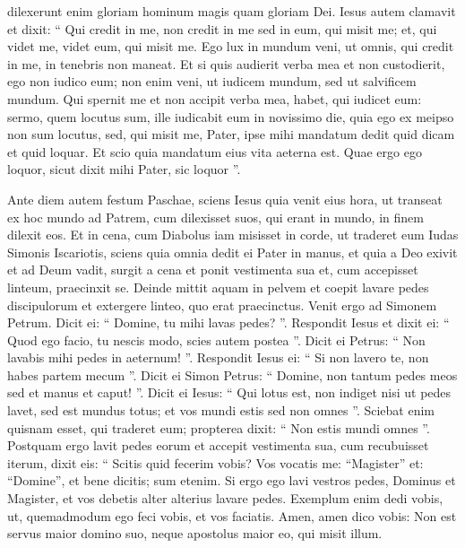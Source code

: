\begin{biblechapter}
\begin{biblechapter}
\begin{biblechapter}
\begin{biblechapter}
\begin{biblechapter}
\begin{biblechapter}
\begin{biblechapter}
\begin{biblechapter}
\begin{biblechapter}
\begin{biblechapter}
\begin{biblechapter}
\begin{biblechapter}
\verse dilexerunt enim gloriam hominum magis quam gloriam Dei.
 \verse Iesus autem clamavit et dixit: “ Qui credit in me, non credit in me sed in eum, qui misit me; 
\verse et, qui videt me, videt eum, qui misit me. 
\verse Ego lux in mundum veni, ut omnis, qui credit in me, in tenebris non maneat. 
\verse Et si quis audierit verba mea et non custodierit, ego non iudico eum; non enim veni, ut iudicem mundum, sed ut salvificem mundum. 
\verse Qui spernit me et non accipit verba mea, habet, qui iudicet eum: sermo, quem locutus sum, ille iudicabit eum in novissimo die, 
\verse quia ego ex meipso non sum locutus, sed, qui misit me, Pater, ipse mihi mandatum dedit quid dicam et quid loquar. 
\verse Et scio quia mandatum eius vita aeterna est. Quae ergo ego loquor, sicut dixit mihi Pater, sic loquor ”.
 
\begin{biblechapter}
\verse Ante diem autem festum Paschae, sciens Iesus quia venit eius hora, ut transeat ex hoc mundo ad Patrem, cum dilexisset suos, qui erant in mundo, in finem dilexit eos. 
\verse Et in cena, cum Diabolus iam misisset in corde, ut traderet eum Iudas Simonis Iscariotis, 
\verse sciens quia omnia dedit ei Pater in manus, et quia a Deo exivit et ad Deum vadit, 
\verse surgit a cena et ponit vestimenta sua et, cum accepisset linteum, praecinxit se. 
\verse Deinde mittit aquam in pelvem et coepit lavare pedes discipulorum et extergere linteo, quo erat praecinctus. 
\verse Venit ergo ad Simonem Petrum. Dicit ei: “ Domine, tu mihi lavas pedes? ”. 
\verse Respondit Iesus et dixit ei: “ Quod ego facio, tu nescis modo, scies autem postea ”. 
\verse Dicit ei Petrus: “ Non lavabis mihi pedes in aeternum! ”. Respondit Iesus ei: “ Si non lavero te, non habes partem mecum ”. 
\verse Dicit ei Simon Petrus: “ Domine, non tantum pedes meos sed et manus et caput! ”. 
\verse Dicit ei Iesus: “ Qui lotus est, non indiget nisi ut pedes lavet, sed est mundus totus; et vos mundi estis sed non omnes ”. 
\verse Sciebat enim quisnam esset, qui traderet eum; propterea dixit: “ Non estis mundi omnes ”.
 \verse Postquam ergo lavit pedes eorum et accepit vestimenta sua, cum recubuisset iterum, dixit eis: “ Scitis quid fecerim vobis? 
\verse Vos vocatis me: “Magister” et: “Domine”, et bene dicitis; sum etenim. 
\verse Si ergo ego lavi vestros pedes, Dominus et Magister, et vos debetis alter alterius lavare pedes. 
 \verse Exemplum enim dedi vobis, ut, quemadmodum ego feci vobis, et vos faciatis. 
 \verse Amen, amen dico vobis: Non est servus maior domino suo, neque apostolus maior eo, qui misit illum. 

\end{biblechapter}
\end{biblechapter}
\end{biblechapter}
\end{biblechapter}
\end{biblechapter}
\end{biblechapter}
\end{biblechapter}
\end{biblechapter}
\end{biblechapter}
\end{biblechapter}
\end{biblechapter}
\end{biblechapter}
\end{biblechapter}
